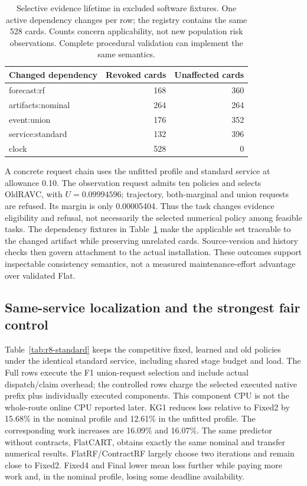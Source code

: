 \begin{table}[!htbp]\centering\small
\caption{Selective evidence lifetime in excluded software fixtures. One active dependency changes per row; the registry contains the same 528 cards. Counts concern applicability, not new population risk observations. Complete procedural validation can implement the same semantics.}\label{tab:r8-dependencies}
\begin{tabular}{@{}lrr@{}}\toprule
Changed dependency & Revoked cards & Unaffected cards\\\midrule
forecast:rf & 168 & 360\\
artifacts:nominal & 264 & 264\\
event:union & 176 & 352\\
service:standard & 132 & 396\\
clock & 528 & 0\\
\bottomrule\end{tabular}\end{table}
A concrete request chain uses the unfitted profile and standard service at allowance 0.10. The observation request admits ten policies and selects OldRAVC, with $U=0.09994596$; trajectory, both-marginal and union requests are refused. Its margin is only 0.00005404. Thus the task changes evidence eligibility and refusal, not necessarily the selected numerical policy among feasible tasks. The dependency fixtures in Table~\ref{tab:r8-dependencies} make the applicable set traceable to the changed artifact while preserving unrelated cards. Source-version and history checks then govern attachment to the actual installation. These outcomes support inspectable consistency semantics, not a measured maintenance-effort advantage over validated Flat.

\subsection{Same-service localization and the strongest fair control}
Table~\ref{tab:r8-standard} keeps the competitive fixed, learned and old policies under the identical standard service, including shared stage budget and load. The Full rows execute the F1 union-request selection and include actual dispatch/claim overhead; the controlled rows charge the selected executed native prefix plus individually executed components. This component CPU is not the whole-route online CPU reported later.
KG1 reduces loss relative to Fixed2 by 15.68\% in the nominal profile and 12.61\% in the unfitted profile. The corresponding work increases are 16.09\% and 16.07\%. The same predictor without contracts, FlatCART, obtains exactly the same nominal and transfer numerical results. FlatRF/ContractRF largely choose two iterations and remain close to Fixed2. Fixed4 and Final lower mean loss further while paying more work and, in the nominal profile, losing some deadline availability.

